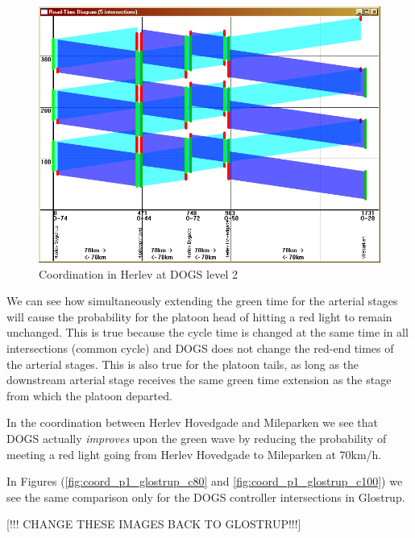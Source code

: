 \begin{figure}[ht]
\begin{center}
\includegraphics[scale=0.30]{coord_p1_herlev_c100.PNG} 
\end{center}
\caption{Coordination in Herlev at DOGS level 2}
\label{fig:coord_p1_herlev_c100}
\end{figure}

We can see how simultaneously extending the green time for the arterial stages will cause the probability for the platoon head of hitting a red light to remain unchanged. This is true because the cycle time is changed at the same time in all intersections (common cycle) and DOGS does not change the red-end times of the arterial stages.
This is also true for the platoon tails, as long as the downstream arterial stage receives the same green time extension as the stage from which the platoon departed.

In the coordination between Herlev Hovedgade and Mileparken we see that DOGS actually \textit{improves} upon the green wave by reducing the probability of meeting a red light going from Herlev Hovedgade to Mileparken at 70km/h.

In Figures (\ref{fig:coord_p1_glostrup_c80} and \ref{fig:coord_p1_glostrup_c100}) we see the same comparison only for the DOGS controller intersections in Glostrup.

[!!! CHANGE THESE IMAGES BACK TO GLOSTRUP!!!]

